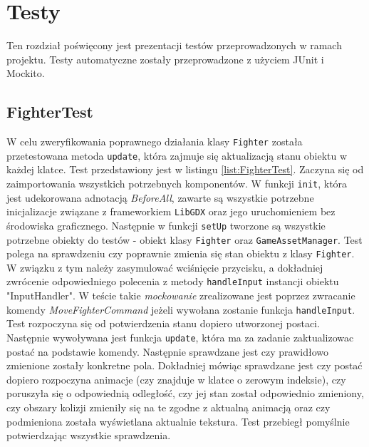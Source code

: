 \chapter{Testy}
Ten rozdział poświęcony jest prezentacji testów przeprowadzonych w ramach projektu. Testy automatyczne zostały przeprowadzone z użyciem JUnit i Mockito.

\section{FighterTest}
W celu zweryfikowania poprawnego działania klasy \texttt{Fighter} została przetestowana metoda \texttt{update}, która zajmuje się aktualizacją stanu obiektu w każdej klatce. Test przedstawiony jest w listingu \ref{list:FighterTest}. Zaczyna się od zaimportowania wszystkich potrzebnych komponentów. W funkcji \texttt{init}, która jest udekorowana adnotacją \emph{BeforeAll}, zawarte są wszystkie potrzebne inicjalizacje związane z frameworkiem \texttt{LibGDX} oraz jego uruchomieniem bez środowiska graficznego. Następnie w funkcji \texttt{setUp} tworzone są wszystkie potrzebne obiekty do testów - obiekt klasy \texttt{Fighter} oraz \texttt{GameAssetManager}. Test polega na sprawdzeniu czy poprawnie zmienia się stan obiektu z klasy \texttt{Fighter}. W związku z tym należy zasymulować wciśnięcie przycisku, a dokładniej zwrócenie odpowiedniego polecenia z metody \texttt{handleInput} instancji obiektu "InputHandler". W teście takie \emph{mockowanie} zrealizowane jest poprzez zwracanie komendy \emph{MoveFighterCommand} jeżeli wywołana zostanie funkcja \texttt{handleInput}.
Test rozpoczyna się od potwierdzenia stanu dopiero utworzonej postaci. Następnie wywoływana jest funkcja \texttt{update}, która ma za zadanie zaktualizowac postać na podstawie komendy. Następnie sprawdzane jest czy prawidłowo zmienione zostały konkretne pola. Dokładniej mówiąc sprawdzane jest czy postać dopiero rozpoczyna animacje (czy znajduje w klatce o zerowym indeksie), czy poruszyła się o odpowiednią odległość, czy jej stan został odpowiednio zmieniony, czy obszary kolizji zmieniły się na te zgodne z aktualną animacją oraz czy podmieniona została wyświetlana aktualnie tekstura. Test przebiegł pomyślnie potwierdzając wszystkie sprawdzenia.
